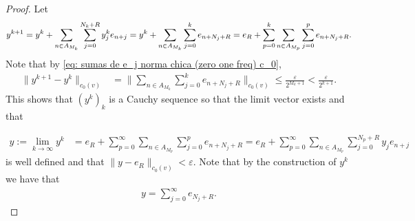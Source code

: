 \documentclass[11pt]{amsart}
\begin{document}
\begin{proof}


Let
\begin{align}\label{eq: def y^{k+1}}
y^{k+1}=y^k+\sum_{n\in A_{M_{k}}}\sum_{j=0}^{N_{k}+R} y^k_j e_{n+j} =y^k+\sum_{n\in A_{M_{k}}}\sum_{j=0}^{k}  e_{n+N_j+R}=e_R+\sum_{p=0}^{k}\sum_{n\in A_{M_p}}\sum_{j=0}^p e_{n+N_j+R}.    
\end{align}
Note that by \eqref{eq: sumas de e_j norma chica (zero one freq) c_0},
\begin{align*}
\|y^{k+1}-y^k\|_{c_0(v)} &=\|\sum_{n\in A_{M_{k}}}\sum_{j=0}^{k}e_{n+N_j+R}\|_{c_0(v)}
\leq \frac{\varepsilon}{2^{M_{k}+1}}<\frac{\varepsilon}{2^{k+1}}.    
\end{align*}
This shows that $(y^k)_k$ is a Cauchy sequence so that the limit vector exists and that

\begin{align*}
y:=\lim_{k\to \infty} y^k &=e_R+\sum_{p=0}^{\infty}\sum_{n\in A_{M_p}}\sum_{j=0}^pe_{n+N_j+R}=e_R+\sum_{p=0}^\infty\sum_{n\in A_{M_p}}\sum_{j=0}^{N_p+R}y_je_{n+j}
\end{align*}
is well defined and that $\|y-e_R\|_{c_0(v)}<\varepsilon.$
Note that by the construction of $y^k$ we have that
\begin{align*}
y=\sum_{j=0}^\infty e_{N_j+R}.
\end{align*}



\end{proof}
\end{document}
